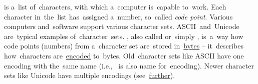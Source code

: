 \label{charactersetencoding}
\begin{itemize}
     is a~list of~characters, with which a~computer is~capable to~work.
            Each character in~the~list has~assigned a~number, so~called \textit{code point}.
            Various computers and~software support various character sets.
            \mbox{ASCII and Unicode} are~typical examples of~character~sets.
    , also called  or~simply , is~a~way how code points (numbers) from a~character set are~stored in~\hyperref[bitsbytes]{bytes} -- it~describes how~characters are~\hyperref[encoding]{encoded} to~bytes.
            Old~character sets like ASCII have one encoding with the~same name (i.e.,~ is also name for~encoding).
            Newer character sets like Unicode have multiple encodings (see~\hyperref[utf]{further}).
\end{itemize}
